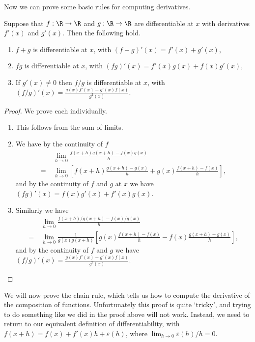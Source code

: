 Now we can prove some basic rules for computing derivatives.

\begin{proposition}
	Suppose that $f: \R \rightarrow \R$ and $g: \R \rightarrow \R$ are differentiable at $x$ with derivatives $f'(x)$ and $g'(x)$.
	Then the following hold.
	\begin{enumerate}[label=(\roman*)]
		\item $f + g$ is differentiable at $x$, with $(f + g)'(x)= f'(x) + g'(x)$,
		\item $fg$ is differentiable at $x$, with $(fg)'(x) = f'(x)g(x) + f(x)g'(x)$,
		\item If $g'(x) \neq 0$ then $f/g$ is differentiable at $x$, with $(f/g)'(x) = \frac{g(x)f'(x) - g'(x)f(x)}{g^2(x)}$.
	\end{enumerate}
\end{proposition}
\begin{proof}
	We prove each individually.
	\begin{enumerate}[label=(\roman*)]
		\item This follows from the sum of limits.
		\item We have by the continuity of $f$
		\begin{align*}
			&\lim_{h \to 0} \frac{f(x + h)g(x + h) - f(x)g(x)}{h} \\
			=\ &\lim_{h \to 0}\left[ f(x+h) \frac{g(x + h) - g(x)}{h} + g(x)\frac{f(x + h) - f(x)}{h}\right],
		\end{align*}
		and by the continuity of $f$ and $g$ at $x$ we have $(fg)'(x) = f(x)g'(x) + f'(x) g(x)$.
		\item Similarly we have
		\begin{align*}
			&\lim_{h \to 0} \frac{f(x + h)/g(x + h) - f(x)/g(x)}{h} \\
		=\ &\lim_{h \to 0} \frac{1}{g(x)g(x + h)} \left[g(x)\frac{f(x + h) - f(x)}{h} - f(x) \frac{g(x + h) - g(x)}{h}\right],
		\end{align*}
		and by the continuity of $f$ and $g$ we have $(f/g)'(x) = \frac{g(x)f'(x) - g'(x)f(x)}{g^2(x)}$. \qedhere
	\end{enumerate}
\end{proof}


We will now prove the chain rule, which tells us how to compute the derivative of the composition of functions. Unfortunately this proof is quite `tricky', and trying to do something like we did in the proof above will not work. Instead, we need to return to our equivalent definition of differentiability, with $f(x + h) = f(x) + f'(x) h + \varepsilon(h)$, where $\displaystyle\lim_{h \to 0}\varepsilon(h)/h = 0$.

